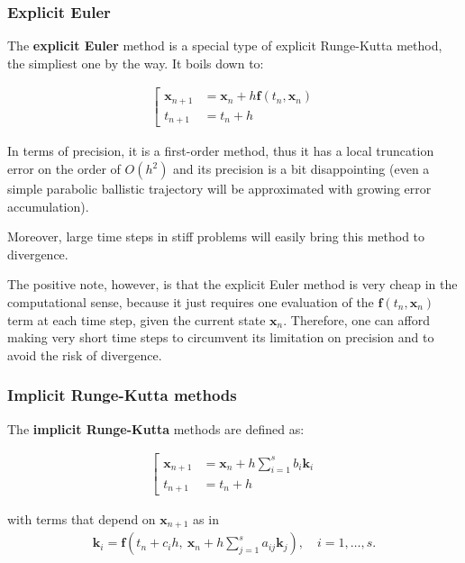 \documentclass{digitaldynamics}
\def\vect#1{\bm{#1}}
\begin{document}
\subsubsection{Explicit Euler}

The \textbf{explicit Euler} method is a special type of explicit Runge-Kutta method, the simpliest one by the way. It boils down to:
\begin{fleqn}
\begin{align}
\left[
\begin{aligned}
\vect{x}_{n+1} &= \vect{x}_n + h \vect{f}(t_n, \vect{x}_n) \\
   t_{n+1} &= t_n + h 
\end{aligned}
\right.
\end{align}
\end{fleqn}

In terms of precision, it is a first-order method, thus it has a local truncation error on the order of $O ( h^2 )$ and its precision is a bit disappointing (even a simple parabolic ballistic trajectory will be approximated with growing error accumulation).

Moreover, large time steps in stiff problems will easily bring this method to divergence. 

The positive note, however, is that the explicit Euler method is very cheap in the computational sense, because it just requires one evaluation of the $\vect{f}(t_n, \vect{x}_n)$ term at each time step, given the current state $\vect{x}_n$.  Therefore, one can afford making very short time steps to circumvent its limitation on precision and to avoid the risk of divergence.


\subsubsection{Implicit Runge-Kutta methods}

The \textbf{implicit Runge-Kutta} methods are defined as:
\begin{fleqn}
\begin{align}
\left[
\begin{aligned}
\vect{x}_{n+1} &= \vect{x}_n + h \sum_{i=1}^s b_i\vect{k}_i \\
t_{n+1} &= t_n + h 
\end{aligned}
\right.
\end{align}
\end{fleqn}
%
with terms that depend on $\vect{x}_{n+1}$ as in
\begin{align}
\vect{k}_i = \vect{f}\left( t_n + c_i h,\ \vect{x}_{n} + h \sum_{j=1}^s a_{ij} \vect{k}_j \right), \quad i = 1, \ldots, s.
\end{align}
\end{document}
